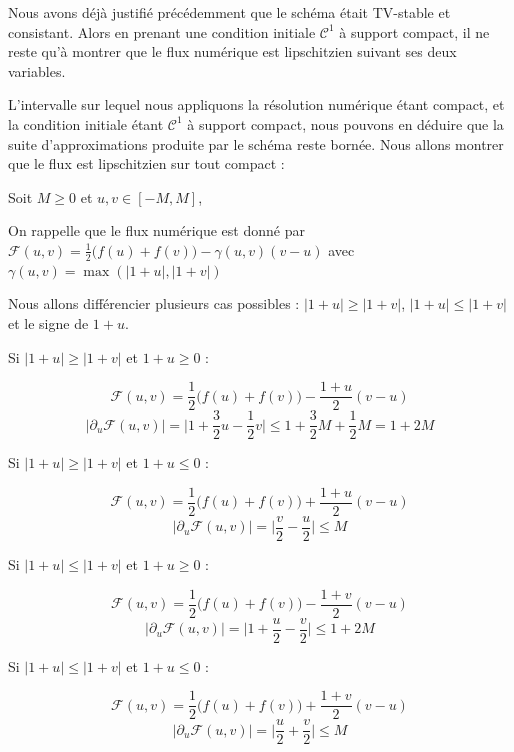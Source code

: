 Nous avons déjà justifié précédemment que le schéma était TV-stable et consistant. Alors en prenant une condition initiale $\mathcal{C}^1$ à support compact, il ne reste qu'à montrer que le flux numérique est lipschitzien suivant ses deux variables.

L'intervalle sur lequel nous appliquons la résolution numérique étant compact, et la condition initiale étant $\mathcal{C}^1$ à support compact, nous pouvons en déduire que la suite d'approximations produite par le schéma reste bornée.
Nous allons montrer que le flux est lipschitzien sur tout compact :

\vspace{1em}

Soit $M\geq 0$ et $u,v \in [-M,M]$,

\vspace{1em}

On rappelle que le flux numérique est donné par $\mathcal{F}(u,v) = \frac{1}{2}\big(f(u) + f(v)\big) - \gamma(u,v)(v-u)$ avec $\gamma(u,v) = \max(|1 + u|,|1 + v|)$

Nous allons différencier plusieurs cas possibles : $|1 + u| \geq |1 + v|$, $|1+u| \leq |1+v|$ et le signe de $1 + u$.

\vspace{1em}

Si $|1 + u| \geq |1 + v|$ et $1 + u \geq 0$ :

$$\mathcal{F}(u,v) = \frac{1}{2}\big(f(u) + f(v)\big) - \frac{1 + u}{2}(v-u)$$
$$\big| \partial_u\mathcal{F}(u,v) \big| = \bigg| 1 + \frac{3}{2}u - \frac{1}{2}v \bigg| \leq 1 + \frac{3}{2}M + \frac{1}{2}M = 1 + 2 M$$

\vspace{1em}
Si $|1 + u| \geq |1 + v|$ et $1 + u \leq 0$ :

$$\mathcal{F}(u,v) = \frac{1}{2}\big(f(u) + f(v)\big) + \frac{1 + u}{2}(v-u)$$
$$\big| \partial_u\mathcal{F}(u,v) \big| = \bigg| \frac{v}{2} - \frac{u}{2} \bigg| \leq M$$

\vspace{1em}
Si $|1 + u| \leq |1 + v|$ et $1 + u \geq 0$ :

$$\mathcal{F}(u,v) = \frac{1}{2}\big(f(u) + f(v)\big) - \frac{1 + v}{2}(v-u)$$
$$\big| \partial_u\mathcal{F}(u,v) \big| = \bigg| 1 + \frac{u}{2} - \frac{v}{2} \bigg| \leq 1 + 2M$$

\vspace{1em}
Si $|1 + u| \leq |1 + v|$ et $1 + u \leq 0$ :

$$\mathcal{F}(u,v) = \frac{1}{2}\big(f(u) + f(v)\big) + \frac{1 + v}{2}(v-u)$$
$$\big| \partial_u\mathcal{F}(u,v) \big| = \bigg| \frac{u}{2} + \frac{v}{2} \bigg| \leq M$$

